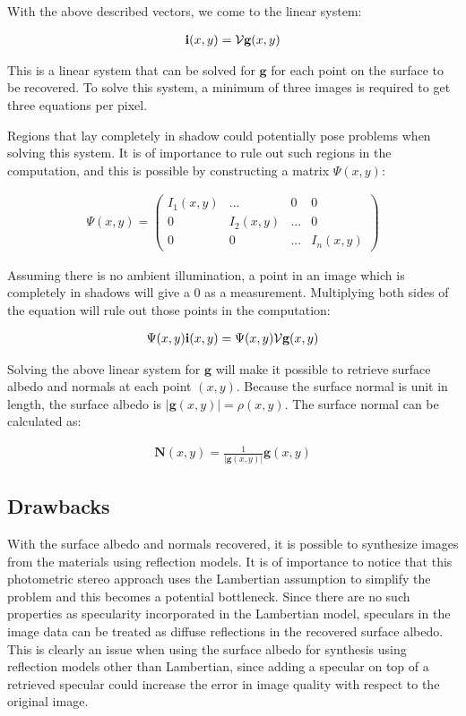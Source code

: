 \noindent With the above described vectors, we come to the linear system:

	\begin{eqnarray*}
		{\bf i}(x,y) = \mathcal{V}\textbf{g}(x,y)
	\end{eqnarray*}

\noindent This is a linear system that can be solved for $\textbf{g}$ for each point on the surface to be recovered. To solve this system, a minimum of three images is required to get three equations per pixel.

Regions that lay completely in shadow could potentially pose problems when solving this system. It is of importance to rule out such regions in the computation, and this is possible by constructing a matrix $\Psi(x,y)$:

	\begin{eqnarray*}
		\Psi(x,y) = \begin{pmatrix} I_1(x,y) & ... & 0 & 0\\ 
									0 & I_2(x,y) & ... & 0\\ 
									0 & 0 & ... & I_n(x,y) \end{pmatrix}
	\end{eqnarray*}

\noindent Assuming there is no ambient illumination, a point in an image which is completely in shadows will give a 0 as a measurement. Multiplying both sides of the equation will rule out those points in the computation:

	\begin{eqnarray*}
		\Psi(x,y){\bf i}(x,y) = \Psi(x,y)\mathcal{V}\textbf{g}(x,y)
	\end{eqnarray*}

\noindent Solving the above linear system for $\textbf{g}$ will make it possible to retrieve surface albedo and normals at each point $(x,y)$. Because the surface normal is unit in length, the surface albedo is $|\textbf{g}(x,y)| = \rho(x,y)$. The surface normal can be calculated as:

	\begin{eqnarray*}
		\textbf{N}(x,y) = \frac{1}{|\textbf{g}(x,y)|}\textbf{g}(x,y)
	\end{eqnarray*}


\subsection{Drawbacks}\label{drawbacks}
With the surface albedo and normals recovered, it is possible to synthesize images from the materials using reflection models. It is of importance to notice that this photometric stereo approach uses the Lambertian assumption to simplify the problem and this becomes a potential bottleneck. Since there are no such properties as specularity incorporated in the Lambertian model, speculars in the image data can be treated as diffuse reflections in the recovered surface albedo. This is clearly an issue when using the surface albedo for synthesis using reflection models other than Lambertian, since adding a specular on top of a retrieved specular could increase the error in image quality with respect to the original image.

